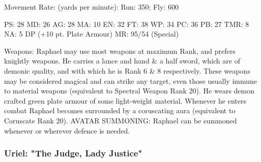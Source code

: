 \begin{Description}
Movement Rate: (yards per minute): Run: 350; Fly: 600

PS: 28	MD: 26	AG: 28	MA: 10
EN: 32	FT: 38	WP: 34	PC: 36
PB: 27	TMR: 8	NA: 5 DP (+10 pt. Plate Armour)
MR: 95/54 (Special)

Weapons: Raphael may use most weapons at maximum Rank, and prefers knightly weapons. He carries a lance and hand \& a half sword, which are of demonic quality, and with which he is Rank 6 \& 8 respectively. These weapons may be considered magical and can strike any target, even those usually immune to material weapons (equivalent to Spectral Weapon Rank 20). He wears demon crafted green plate armour of some light-weight material. Whenever he enters combat Raphael becomes surrounded by a coruscating aura (equivalent to Coruscate Rank 20).
AVATAR SUMMONING: Raphael can be summoned whenever or wherever defence is needed. 
\end{Description}


\subsubsection{Uriel: "The Judge, Lady Justice"}

